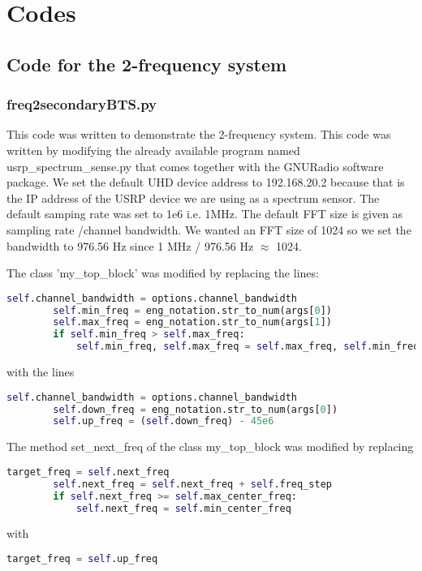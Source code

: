 \chapter{Codes}

\section{Code for the 2-frequency system}


\subsection{freq2secondaryBTS.py}

This code was written to demonstrate the 2-frequency system.
This code was written by modifying the already available program named 
\textsf{usrp\_spectrum\_sense.py} that comes together with the GNURadio software
package. We set the 
default UHD device address to \textsf{192.168.20.2} because that is the IP address
of the USRP device we are using as a spectrum sensor. The default samping rate
was set to 1e6 i.e. 1MHz. The default FFT size is given as
\textsf{sampling rate /channel bandwidth}. We wanted an FFT size of 1024 so we
set the bandwidth to
976.56 Hz since 1 MHz / 976.56 Hz $\approx$ 1024.

The class 'my\_top\_block' was modified by replacing the lines:
\begin{lstlisting}[language=Python]
        self.channel_bandwidth = options.channel_bandwidth
        self.min_freq = eng_notation.str_to_num(args[0])
        self.max_freq = eng_notation.str_to_num(args[1])
        if self.min_freq > self.max_freq:
            self.min_freq, self.max_freq = self.max_freq, self.min_freq    
\end{lstlisting}
with the lines
\begin{lstlisting}[language=Python]
        self.channel_bandwidth = options.channel_bandwidth
        self.down_freq = eng_notation.str_to_num(args[0])
        self.up_freq = (self.down_freq) - 45e6    
\end{lstlisting}

The method \textsf{set\_next\_freq} of the class \textsf{my\_top\_block} was modified by
replacing
\begin{lstlisting}[language=Python]
        target_freq = self.next_freq
        self.next_freq = self.next_freq + self.freq_step
        if self.next_freq >= self.max_center_freq:
            self.next_freq = self.min_center_freq
\end{lstlisting}
with
\begin{lstlisting}[language=Python]
        target_freq = self.up_freq
\end{lstlisting}




